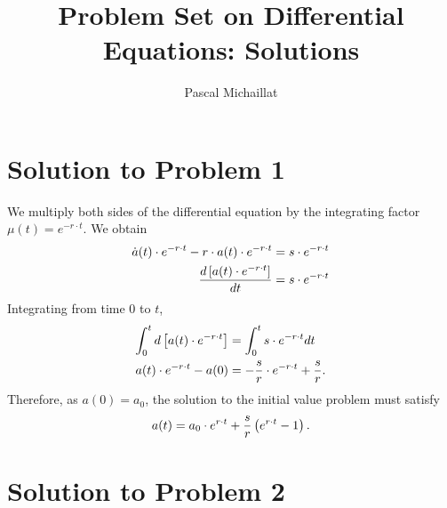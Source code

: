 \documentclass[letterpaper,12pt,leqno]{article}
\begin{document}
\title{Problem Set on Differential Equations: Solutions}
\author{Pascal Michaillat}
\date{}

\begin{titlepage}
\maketitle
\end{titlepage}

\section*{Solution to Problem 1}

We multiply both sides of the differential equation by the integrating factor $\mu (t)=e^{-r\cdot t}$. We obtain
\begin{align*}
\dot{a}(t)\cdot e^{-r\cdot t}-r\cdot a(t) \cdot e^{-r\cdot t}&=s\cdot e^{-r\cdot t}\\
\frac{d \left[ a(t)\cdot e^{-r\cdot t} \right]}{d t}&=s\cdot e^{-r\cdot t}
\end{align*}
Integrating from time $0$ to $t$, 
\begin{align*}
\int_{0}^{t}d\left[ a(t)\cdot e^{-r\cdot t} \right]&=\int_{0}^{t} s\cdot e^{-r\cdot t} dt\\
a(t)\cdot e^{-r\cdot t}-a(0)&=-\frac{s}{r}\cdot e^{-r\cdot t}+\frac{s}{r}.
\end{align*}
Therefore, as $a(0)=a_{0}$, the solution to the initial value problem must satisfy 
\begin{align*}
a(t)=a_{0}\cdot e^{r\cdot t}+\frac{s}{r}\left( e^{r\cdot t}-1 \right).
\end{align*}

\section*{Solution to Problem 2}
\end{document}
